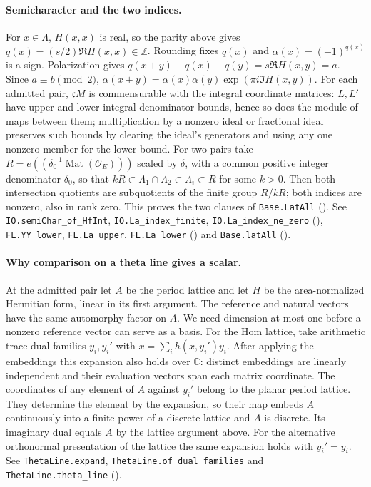 \paragraph{Semicharacter and the two indices.}\label{r14:lat-indices}
For $x\in\Lambda$, $H(x,x)$ is real, so the parity above gives
$q(x)=(s/2)\Re H(x,x)\in\mathbb Z$. Rounding fixes $q(x)$ and
$\alpha(x)=(-1)^{q(x)}$ is a sign. Polarization gives
$q(x+y)-q(x)-q(y)=s\Re H(x,y)=a$. Since $a\equiv b\pmod2$,
$\alpha(x+y)=\alpha(x)\alpha(y)\exp(\pi i\Im H(x,y))$.
For each admitted pair, $\mathfrak cM$ is commensurable with the integral
coordinate matrices: $L,L'$ have upper and lower integral denominator
bounds, hence so does the module of maps between them; multiplication by a
nonzero ideal or fractional ideal preserves such bounds by clearing the
ideal's generators and using any one nonzero member for the lower bound.
For two pairs take $R=e((\delta_0^{-1}\operatorname{Mat}(\mathcal O_E)))$
scaled by $\delta$, with a common positive integer denominator $\delta_0$,
so that $kR\subset\Lambda_1\cap\Lambda_2\subset\Lambda_i\subset R$
for some $k>0$. Then both intersection quotients are subquotients of the
finite group $R/kR$; both indices are nonzero, also in rank zero.
This proves the two clauses of \nolinkurl{Base.LatAll}
().
See \nolinkurl{IO.semiChar_of_HfInt}, \nolinkurl{IO.La_index_finite},
\nolinkurl{IO.La_index_ne_zero} (),
\nolinkurl{FL.YY_lower}, \nolinkurl{FL.La_upper}, \nolinkurl{FL.La_lower}
() and
\nolinkurl{Base.latAll} ().

\paragraph{Why comparison on a theta line gives a scalar.}\label{r14:line}
At the admitted pair let $A$ be the period lattice and let $H$ be the
area-normalized Hermitian form, linear in its first argument. The reference
and natural vectors have the same automorphy factor on $A$. We need
dimension at most one before a nonzero reference vector can serve as a
basis. For the Hom lattice, take arithmetic trace-dual families $y_i,y_i'$
with $x=\sum_i h(x,y_i')y_i$. After applying the embeddings this expansion
also holds over $\mathbb C$: distinct embeddings are linearly independent
and their evaluation vectors span each matrix coordinate. The coordinates
of any element of $A$ against $y_i'$ belong to the planar period lattice.
They determine the element by the expansion, so their map embeds $A$
continuously into a finite power of a discrete lattice and $A$ is
discrete. Its imaginary dual equals $A$ by the lattice argument above.
For the alternative orthonormal presentation of the lattice the same
expansion holds with $y_i'=y_i$.
See \nolinkurl{ThetaLine.expand}, \nolinkurl{ThetaLine.of_dual_families}
and \nolinkurl{ThetaLine.theta_line}
().

